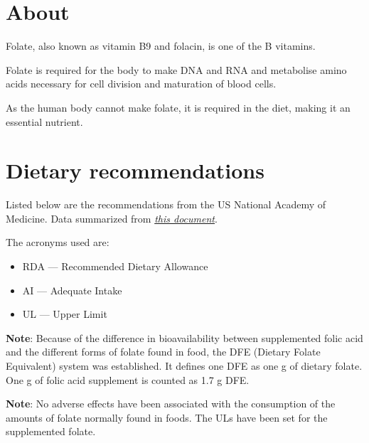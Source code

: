 \documentclass{book}
\begin{document}
\begin{sloppypar}
\section{About}
Folate, also known as vitamin B9 and folacin, is one of the B vitamins.

Folate is required for the body to make DNA and RNA and metabolise amino acids necessary for cell division and maturation of blood cells.

As the human body cannot make folate, it is required in the diet, making it an essential nutrient.

\section{Dietary recommendations}
Listed below are the recommendations from the US National Academy of Medicine. Data summarized from \href{https://nap.nationalacademies.org/read/6015/chapter/10}{\textit{this document}}.

The acronyms used are:
\begin{itemize}
	\item RDA --- Recommended Dietary Allowance
	\item AI --- Adequate Intake
	\item UL --- Upper Limit
\end{itemize}

\textbf{Note}: Because of the difference in bioavailability between supplemented folic acid and the different forms of folate found in food, the DFE (Dietary Folate Equivalent) system was established.
It defines one DFE as one \textmu g of dietary folate. One \textmu g of folic acid supplement is counted as 1.7 \textmu g DFE.

\textbf{Note}: No adverse effects have been associated with the consumption of the amounts of folate normally found in foods. The ULs have been set for the supplemented folate.


\end{sloppypar}
\end{document}
